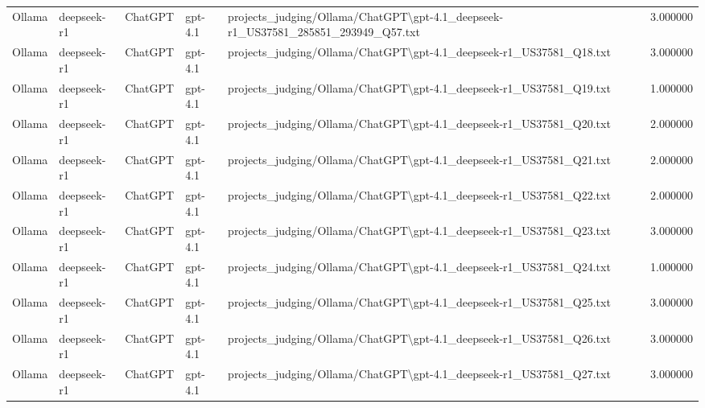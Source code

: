 \begin{table}[H]
\begin{tabular}{lllllr}
Ollama & deepseek-r1 & ChatGPT & gpt-4.1 & projects\_judging/Ollama/ChatGPT\textbackslash gpt-4.1\_deepseek-r1\_US37581\_285851\_293949\_Q57.txt & 3.000000 \\
Ollama & deepseek-r1 & ChatGPT & gpt-4.1 & projects\_judging/Ollama/ChatGPT\textbackslash gpt-4.1\_deepseek-r1\_US37581\_Q18.txt & 3.000000 \\
Ollama & deepseek-r1 & ChatGPT & gpt-4.1 & projects\_judging/Ollama/ChatGPT\textbackslash gpt-4.1\_deepseek-r1\_US37581\_Q19.txt & 1.000000 \\
Ollama & deepseek-r1 & ChatGPT & gpt-4.1 & projects\_judging/Ollama/ChatGPT\textbackslash gpt-4.1\_deepseek-r1\_US37581\_Q20.txt & 2.000000 \\
Ollama & deepseek-r1 & ChatGPT & gpt-4.1 & projects\_judging/Ollama/ChatGPT\textbackslash gpt-4.1\_deepseek-r1\_US37581\_Q21.txt & 2.000000 \\
Ollama & deepseek-r1 & ChatGPT & gpt-4.1 & projects\_judging/Ollama/ChatGPT\textbackslash gpt-4.1\_deepseek-r1\_US37581\_Q22.txt & 2.000000 \\
Ollama & deepseek-r1 & ChatGPT & gpt-4.1 & projects\_judging/Ollama/ChatGPT\textbackslash gpt-4.1\_deepseek-r1\_US37581\_Q23.txt & 3.000000 \\
Ollama & deepseek-r1 & ChatGPT & gpt-4.1 & projects\_judging/Ollama/ChatGPT\textbackslash gpt-4.1\_deepseek-r1\_US37581\_Q24.txt & 1.000000 \\
Ollama & deepseek-r1 & ChatGPT & gpt-4.1 & projects\_judging/Ollama/ChatGPT\textbackslash gpt-4.1\_deepseek-r1\_US37581\_Q25.txt & 3.000000 \\
Ollama & deepseek-r1 & ChatGPT & gpt-4.1 & projects\_judging/Ollama/ChatGPT\textbackslash gpt-4.1\_deepseek-r1\_US37581\_Q26.txt & 3.000000 \\
Ollama & deepseek-r1 & ChatGPT & gpt-4.1 & projects\_judging/Ollama/ChatGPT\textbackslash gpt-4.1\_deepseek-r1\_US37581\_Q27.txt & 3.000000 \\
\bottomrule
\end{tabular}
\end{table}
